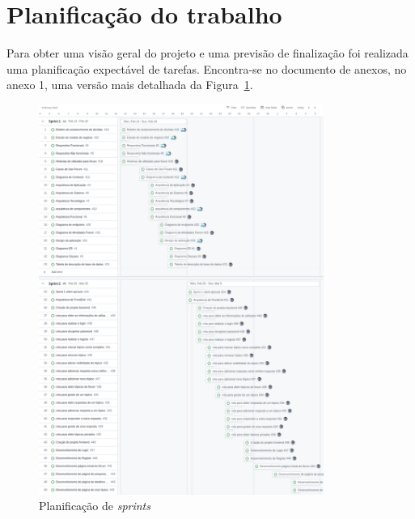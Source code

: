 \newpage

\section{Planificação do trabalho}\label{sec:planificacao trabalho}

Para obter uma visão geral do projeto e uma previsão de finalização foi realizada uma planificação expectável de tarefas. Encontra-se no documento de anexos, no anexo 1, uma versão mais detalhada da Figura~\ref*{fig:1}.

\begin{figure}[htb]
  \centering
  
  \includegraphics[width=0.83\textwidth]{images/etapa1_sprint_planning.png}
  \caption{Planificação de \textit{sprints}}
  \label{fig:1}
\end{figure}
